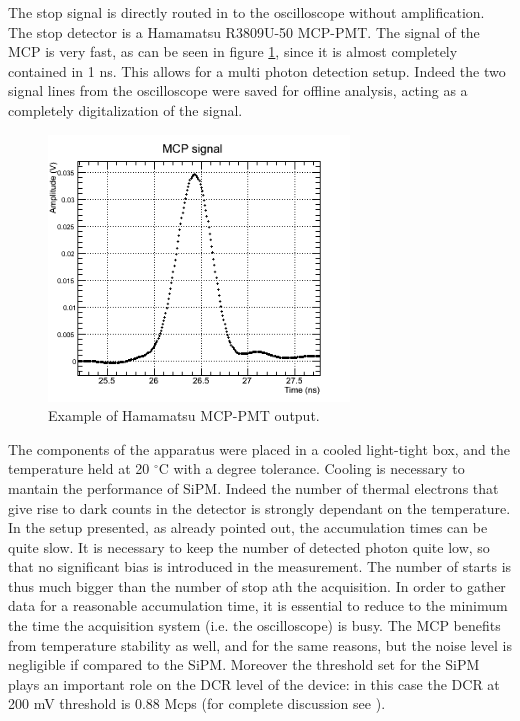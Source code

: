 The stop signal is directly routed in to the oscilloscope without amplification. The stop detector is a Hamamatsu R3809U-50 MCP-PMT.
The signal of the MCP is very fast, as can be seen in figure \ref{fig:MCP_sign}, since it is almost completely contained in 1 ns. This allows for a multi photon detection setup.
Indeed the two signal lines from the oscilloscope were saved for offline analysis, acting as a completely digitalization of the signal.
\begin{figure}[htbp]
\begin{center}
\includegraphics[width=8cm]{../Pictures/Chapter_8/MCP_signal.png}
\end{center}
\caption[MCP signal sample]{Example of Hamamatsu MCP-PMT output.}
\label{fig:MCP_sign}
\end{figure}
The components of the apparatus were placed in a cooled light-tight box, and the temperature held at 20 $^{\circ}$C with a degree tolerance.
Cooling is necessary to mantain the performance of SiPM. Indeed the number of thermal electrons that give rise to dark counts in the detector is strongly dependant on the temperature.
In the setup presented, as already pointed out, the accumulation times can be quite slow. It is necessary to keep the number of detected photon quite low, so that no significant bias is introduced in the measurement. The number of starts is thus much bigger than the number of stop ath the acquisition. In order to gather data for a reasonable accumulation time, it is essential to reduce to the minimum the time the acquisition system (i.e. the oscilloscope) is busy.
The MCP benefits from temperature stability as well, and for the same reasons, but the noise level is negligible if compared to the SiPM.
Moreover the threshold set for the SiPM plays an important role on the DCR level of the device: in this case the DCR at 200 mV threshold is 0.88 Mcps (for complete discussion see \cite{Gundacker2014}). 

